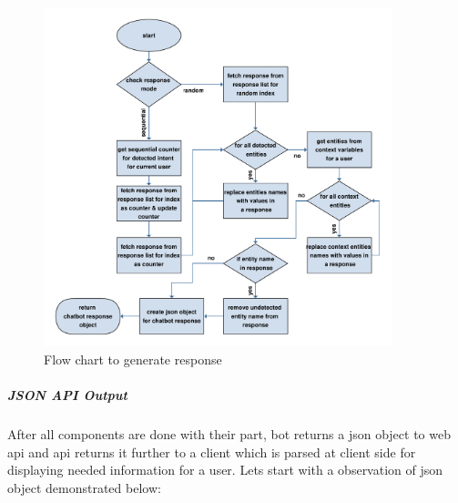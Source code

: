 \begin{figure}[!h]
    \centering
    \includegraphics[width=0.9\textwidth]{img/Response_generator.pdf}
    \caption{Flow chart to generate response }
    \label{fig:flowRespGen}
\end{figure}

\subparagraph*{JSON API Output}
After all components are done with their part, bot returns a json object to web api and api returns it further to a client which is parsed at client side for displaying needed information for a user. Lets start with a observation of json object demonstrated below:

